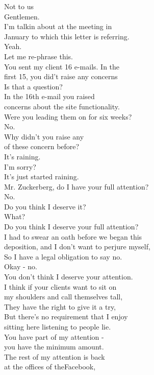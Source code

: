 \documentclass{article}
\begin{document}
\begin{multicols}{3}
Not to us\\
Gentlemen.\\
I'm talkin about at the meeting in\\
January to which this letter is referring.\\
Yeah.\\
Let me re-phrase this.\\
You sent my client 16 e-mails. In the\\
first 15, you did't raise any concerns\\
Is that a question?\\
In the 16th e-mail you raised\\
concerns about the site functionality.\\
Were you leading them on for six weeks?\\
No.\\
Why didn't you raise any\\
of these concern before?\\
It's raining.\\
I'm sorry?\\
It's just started raining.\\
Mr. Zuckerberg, do I have your full attention?\\
No.\\
Do you think I deserve it?\\
What?\\
Do you think I deserve your full attention?\\
I had to swear an oath before we began this\\
deposition, and I don't want to perjure myself,\\
So I have a legal obligation to say no.\\
Okay - no.\\
You don't think I deserve your attention.\\
I think if your clients want to sit on\\
my shoulders and call themselves tall,\\
They have the right to give it a try,\\
But there's no requirement that I enjoy\\
sitting here listening to people lie.\\
You have part of my attention -\\
you have the minimum amount.\\
The rest of my attention is back\\
at the offices of theFacebook,\\

\end{multicols}
\end{document}
